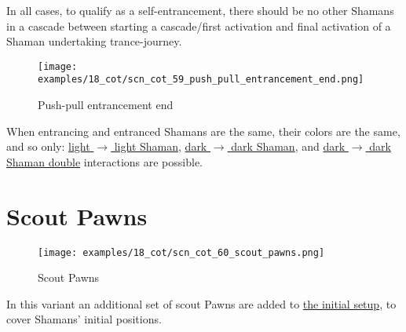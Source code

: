 In all cases, to qualify as a self-entrancement, there should be no other Shamans
in a cascade between starting a cascade/first activation and final activation of
a Shaman undertaking trance-journey.

\clearpage %

\noindent
\begin{figure}[!h]
\texttt{[image: examples/18\_cot/scn\_cot\_59\_push\_pull\_entrancement\_end.png]}
\caption{Push-pull entrancement end}
\label{fig:scn_cot_59_push_pull_entrancement_end}
\end{figure}

When entrancing and entranced Shamans are the same, their colors are the same, and so only: \newline
\hyperref[fig:scn_cot_42_light_light_shaman_interaction_start]{light $\rightarrow$ light Shaman}, \newline
\hyperref[fig:scn_cot_46_dark_dark_shaman_interaction_start]{dark $\rightarrow$ dark Shaman}, and \newline
\hyperref[fig:scn_cot_48_dark_dark_shaman_double_interaction_start]{dark $\rightarrow$ dark Shaman double}
interactions are possible.

\clearpage %

\section*{Scout Pawns}
\label{sec:Conquest of Tlalocan/Scout Pawns}

\vspace*{-1.2\baselineskip}
\noindent
\begin{figure}[!h]
\texttt{[image: examples/18\_cot/scn\_cot\_60\_scout\_pawns.png]}
\caption{Scout Pawns}
\label{fig:scn_cot_60_scout_pawns}
\end{figure}

In this variant an additional set of scout Pawns are added to
\hyperref[fig:18_conquest_of_tlalocan]{the initial setup},
to cover Shamans' initial positions.

\clearpage %


